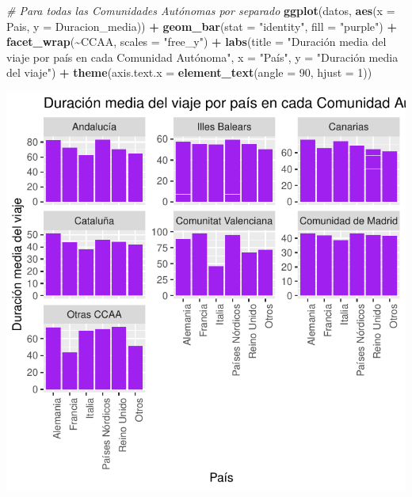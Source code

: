 \documentclass[data,article,submit,moreauthors,pdftex]{Definitions/mdpi}
\newenvironment{Shaded}{\begin{snugshade}}{\end{snugshade}}
\newcommand{\AttributeTok}[1]{\textcolor[rgb]{0.13,0.29,0.53}{#1}}
\newcommand{\CommentTok}[1]{\textcolor[rgb]{0.56,0.35,0.01}{\textit{#1}}}
\newcommand{\DecValTok}[1]{\textcolor[rgb]{0.00,0.00,0.81}{#1}}
\newcommand{\FunctionTok}[1]{\textcolor[rgb]{0.13,0.29,0.53}{\textbf{#1}}}
\newcommand{\NormalTok}[1]{#1}
\newcommand{\SpecialCharTok}[1]{\textcolor[rgb]{0.81,0.36,0.00}{\textbf{#1}}}
\newcommand{\StringTok}[1]{\textcolor[rgb]{0.31,0.60,0.02}{#1}}
\begin{document}
\begin{Shaded}
\begin{Highlighting}[]
\CommentTok{\# Para todas las Comunidades Autónomas por separado}
\FunctionTok{ggplot}\NormalTok{(datos, }\FunctionTok{aes}\NormalTok{(}\AttributeTok{x =}\NormalTok{ Pais, }\AttributeTok{y =}\NormalTok{ Duracion\_media)) }\SpecialCharTok{+} \FunctionTok{geom\_bar}\NormalTok{(}\AttributeTok{stat =} \StringTok{"identity"}\NormalTok{,}
    \AttributeTok{fill =} \StringTok{"purple"}\NormalTok{) }\SpecialCharTok{+} \FunctionTok{facet\_wrap}\NormalTok{(}\SpecialCharTok{\textasciitilde{}}\NormalTok{CCAA, }\AttributeTok{scales =} \StringTok{"free\_y"}\NormalTok{) }\SpecialCharTok{+}
    \FunctionTok{labs}\NormalTok{(}\AttributeTok{title =} \StringTok{"Duración media del viaje por país en cada Comunidad Autónoma"}\NormalTok{,}
        \AttributeTok{x =} \StringTok{"País"}\NormalTok{, }\AttributeTok{y =} \StringTok{"Duración media del viaje"}\NormalTok{) }\SpecialCharTok{+} \FunctionTok{theme}\NormalTok{(}\AttributeTok{axis.text.x =} \FunctionTok{element\_text}\NormalTok{(}\AttributeTok{angle =} \DecValTok{90}\NormalTok{,}
    \AttributeTok{hjust =} \DecValTok{1}\NormalTok{))}
\end{Highlighting}
\end{Shaded}

\includegraphics{ProyectoAED2024_Rmd_files/figure-latex/unnamed-chunk-28-1.pdf}
\end{document}
